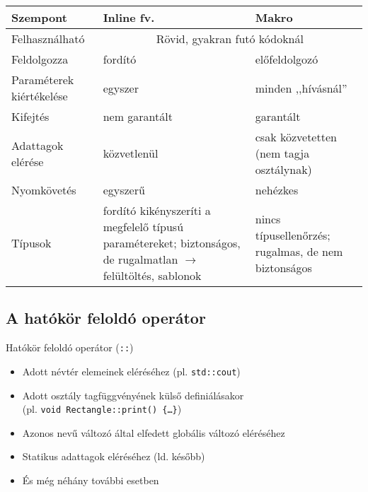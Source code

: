 \documentclass[usenames,dvipsnames,aspectratio=169]{beamer}
\begin{document}
\begin{frame}
    \begin{center}
        \begin{tabular}{ p{2.5cm}|p{5cm}|p{5cm} } 
        Szempont & Inline fv. & Makro \\
        \hline
        Felhasználható & \multicolumn{2}{c}{Rövid, gyakran futó kódoknál} \\
        Feldolgozza & fordító & előfeldolgozó \\ 
        Paraméterek kiértékelése & egyszer & minden ,,hívásnál'' \\ 
        Kifejtés & nem garantált & garantált \\ 
        Adattagok elérése & közvetlenül & csak közvetetten (nem tagja osztálynak) \\ 
        Nyomkövetés & egyszerű & nehézkes \\
        Típusok & fordító kikényszeríti a megfelelő típusú paramétereket; biztonságos, de rugalmatlan $\to$ felültöltés, sablonok & nincs típusellenőrzés; rugalmas, de nem biztonságos \\
        \end{tabular}
    \end{center}
\end{frame}

\subsection{A hatókör feloldó operátor}

\begin{frame}
    Hatókör feloldó operátor (\texttt{::})
    \begin{itemize}
        \item Adott névtér elemeinek eléréséhez (pl. \texttt{std::cout})
        \item Adott osztály tagfüggvényének külső definiálásakor \\
        (pl. \texttt{void Rectangle::print() \{\dots \}})
        \item Azonos nevű változó által elfedett globális változó eléréséhez
        \item Statikus adattagok eléréséhez (ld. később)
        \item És még néhány további esetben
    \end{itemize}
\end{frame}
\end{document}
